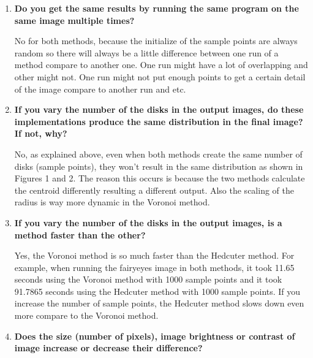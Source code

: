 \documentclass[11pt]{article}
\begin{document}
\begin{enumerate}
\item \textbf{Do you get the same results by running the same program on the same image multiple times?}

\begin{adjustwidth}{24pt}{}
No for both methods, because the initialize of the sample points are always random so there will always be a little difference between one run of a method compare to another one. One run might have a lot of overlapping and other might not. One run might not put enough points to get a certain detail of the image compare to another run and etc.
\end{adjustwidth}

\item \textbf{If you vary the number of the disks in the output images,  do these implementations produce the same distribution in the final image? If not, why?}

\begin{adjustwidth}{24pt}{}
No, as explained above, even when both methods create the same number of disks (sample points), they won't result in the same distribution as shown in \newline Figures 1 and 2. The reason this occurs is because the two methods calculate the centroid differently resulting a different output. Also the scaling of the radius is way more dynamic in the Voronoi method.
\end{adjustwidth}

\item \textbf{If you vary the number of the disks in the output images,  is a method faster than the other?}

\begin{adjustwidth}{24pt}{}Yes, the Voronoi method is so much faster than the Hedcuter method. For example, when running the fairyeyes image in both methods, it took 11.65 seconds using the Voronoi method with 1000 sample points and it took 91.7865 seconds using the Hedcuter method with 1000 sample points. If you increase the number of sample points, the Hedcuter method slows down even more compare to the Voronoi method. 
\end{adjustwidth}

\item \textbf{Does the size (number of pixels), image brightness or contrast of image increase or decrease their difference?}

\hfill


\end{enumerate}
\end{document}
